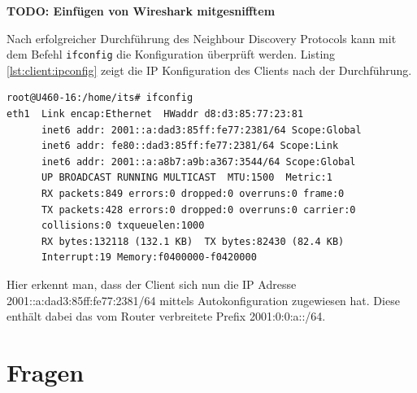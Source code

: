 \documentclass[a4paper,12pt]{article} %
\begin{document}
\textbf{TODO: Einfügen von Wireshark mitgesnifftem}

Nach erfolgreicher Durchführung des Neighbour Discovery Protocols kann mit dem Befehl \verb!ifconfig! die Konfiguration überprüft werden. Listing \ref{lst:client:ipconfig} zeigt die IP Konfiguration des Clients nach der Durchführung.
\begin{lstlisting}[style=code,caption={IP Konfiguration des Clients},label=lst:client:ipconfig]
root@U460-16:/home/its# ifconfig
eth1  Link encap:Ethernet  HWaddr d8:d3:85:77:23:81  
      inet6 addr: 2001::a:dad3:85ff:fe77:2381/64 Scope:Global
      inet6 addr: fe80::dad3:85ff:fe77:2381/64 Scope:Link
      inet6 addr: 2001::a:a8b7:a9b:a367:3544/64 Scope:Global
      UP BROADCAST RUNNING MULTICAST  MTU:1500  Metric:1
      RX packets:849 errors:0 dropped:0 overruns:0 frame:0
      TX packets:428 errors:0 dropped:0 overruns:0 carrier:0
      collisions:0 txqueuelen:1000 
      RX bytes:132118 (132.1 KB)  TX bytes:82430 (82.4 KB)
      Interrupt:19 Memory:f0400000-f0420000  
\end{lstlisting}
Hier erkennt man, dass der Client sich nun die IP Adresse 2001::a:dad3:85ff:fe77:2381/64 mittels Autokonfiguration zugewiesen hat. Diese enthält dabei das vom Router verbreitete Prefix 2001:0:0:a::/64.



\section{Fragen}
\end{document}
